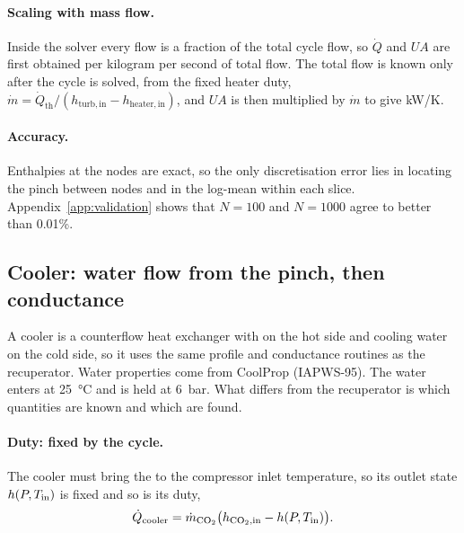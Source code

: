 \paragraph{Scaling with mass flow.} Inside the solver every flow is a fraction of the total cycle flow, so $\dot Q$ and $UA$ are first obtained per kilogram per second of total flow. The total flow is known only after the cycle is solved, from the fixed heater duty, $\dot m = \dot Q_\mathrm{th}/(h_\mathrm{turb,in} - h_\mathrm{heater,in})$, and $UA$ is then multiplied by $\dot m$ to give \si{kW/K}.

\paragraph{Accuracy.} Enthalpies at the nodes are exact, so the only discretisation error lies in locating the pinch between nodes and in the log-mean within each slice. Appendix~\ref{app:validation} shows that $N = 100$ and $N = 1000$ agree to better than 0.01\%.


\subsection{Cooler: water flow from the pinch, then conductance}
A cooler is a counterflow heat exchanger with \cotwo{} on the hot side and cooling water on the cold side, so it uses the same profile and conductance routines as the recuperator. Water properties come from CoolProp (IAPWS-95). The water enters at \SI{25}{\celsius} and is held at \SI{6}{bar}. What differs from the recuperator is which quantities are known and which are found.

\paragraph{Duty: fixed by the cycle.} The cooler must bring the \cotwo{} to the compressor inlet temperature, so its outlet state $h(P, T_\mathrm{in})$ is fixed and so is its duty,
\begin{equation}
\dot Q_\mathrm{cooler} = \dot m_\mathrm{CO_2}\big(h_\mathrm{CO_2,in} - h(P, T_\mathrm{in})\big).
\end{equation}

